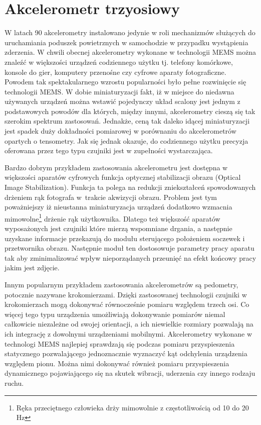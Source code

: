 \section{Akcelerometr trzyosiowy}
\label{sec:accelometer}
W latach 90 akcelerometry instalowano jedynie w roli mechanizmów służących do
uruchamiania poduszek powietrznych w samochodzie w przypadku wystąpienia
zderzenia. W chwili obecnej akcelerometry wykonane w technologii
MEMS można znaleźć w większości urządzeń codziennego użytku tj.
telefony komórkowe, konsole do gier, komputery przenośne czy cyfrowe aparaty
fotograficzne. Powodem tak spektakularnego wzrostu popularności było pełne
rozwinięcie się technologii MEMS. W dobie miniaturyzacji fakt, iż w miejsce do
niedawna używanych urządzeń można wstawić pojedynczy układ
scalony jest jednym z podstawowych powodów dla których, między innymi,
akcelerometry cieszą się tak szerokim spektrum zastosowań. Jednakże, ceną tak
daleko idącej miniaturyzacji jest spadek duży dokładności pomiarowej w
porównaniu do akcelerometrów opartych o tensometry. Jak się jednak okazuje, do
codziennego użytku precyzja oferowana przez tego typu czujniki jest w zupełności wystarczająca.

Bardzo dobrym przykładem zastosowania akcelerometru jest dostępna w większości
aparatów cyfrowych funkcja optycznej stabilizacji obrazu (Optical Image
Stabilization). Funkcja ta polega na redukcji zniekształceń  spowodowanych
drżeniem rąk fotografa w~trakcie akwizycji obrazu. Problem jest tym poważniejszy
iż nieustanna miniaturyzacja urządzeń dodatkowo wzmacnia mimowolne\footnote{Ręka
przeciętnego człowieka drży mimowolnie z częstotliwością od 10 do 20 Hz} drżenie
rąk użytkownika. Dlatego też większość aparatów wyposażonych jest czujniki które
mierzą wspomniane drgania, a następnie uzyskane informacje przekazują do modułu
sterującego położeniem soczewek i przetwornika obrazu. Następnie moduł ten
dostosowuje parametry pracy aparatu tak aby zminimalizować wpływ nieporządanych przeunięć
na efekt końcowy pracy jakim jest zdjęcie.

Innym popularnym przykładem zastosowania akcelerometrów są pedometry, potocznie 
nazywane krokomierzami. Dzięki zastosowanej technologii czujniki w krokomierzach
mogą dokonywać równocześnie pomiaru względem trzech osi. Co więcej tego typu
urządzenia umożliwiają dokonywanie pomiarów niemal całkowicie niezależne od
swojej orientacji, a ich niewielkie rozmiary pozwalają na ich integrację z 
dowolnymi urządzeniami mobilnymi. Akcelerometry wykonane w technologi MEMS
najlepiej sprawdzają się  podczas pomiaru przyspieszenia statycznego
pozwalającego jednoznacznie wyznaczyć kąt odchylenia urządzenia względem pionu. 
Można nimi dokonywać również pomiaru przyspieszenia dynamicznego pojawiającego 
się na skutek wibracji, uderzenia czy innego rodzaju ruchu. 

